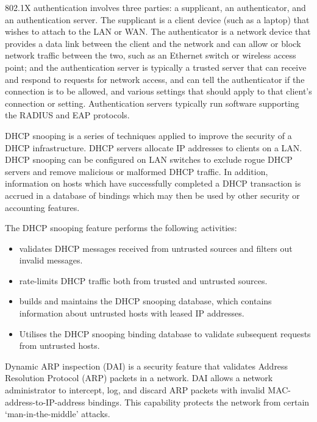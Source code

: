 {\begin{description}
   802.1X authentication involves three parties: a supplicant, an authenticator, and an authentication server.
   The supplicant is a client device (such as a laptop) that wishes to attach to the LAN or WAN.
   The authenticator is a network device that provides a data link between the client and the network and can allow or block network traffic between the two, such as an Ethernet switch or wireless access point; and the authentication server is typically a trusted server that can receive and respond to requests for network access, and can tell the authenticator if the connection is to be allowed, and various settings that should apply to that client's connection or setting.
   Authentication servers typically run software supporting the RADIUS and EAP protocols.
\item[DHCP snooping]
   DHCP snooping is a series of techniques applied to improve the security of a DHCP infrastructure.
   DHCP servers allocate IP addresses to clients on a LAN.
   DHCP snooping can be configured on LAN switches to exclude rogue DHCP servers and remove malicious or malformed DHCP traffic.
   In addition, information on hosts which have successfully completed a DHCP transaction is accrued in a database of bindings which may then be used by other security or accounting features.
   
   The DHCP snooping feature performs the following activities:
   \begin{itemize}
   \item validates DHCP messages received from untrusted sources and filters out invalid messages.
   \item rate-limits DHCP traffic both from trusted and untrusted sources.
   \item builds and maintains the DHCP snooping database, which contains information about untrusted hosts with leased IP addresses.
   \item Utilises the DHCP snooping binding database to validate subsequent requests from untrusted hosts.
   \end{itemize}
\item[dynamic ARP inspecition]
   Dynamic ARP inspection (DAI) is a security feature that validates Address Resolution Protocol (ARP) packets in a network.
   DAI allows a network administrator to intercept, log, and discard ARP packets with invalid MAC-address-to-IP-address bindings.
   This capability protects the network from certain `man-in-the-middle' attacks.
\end{description}
}


